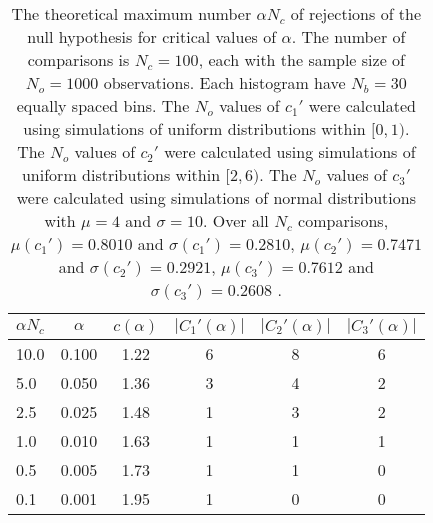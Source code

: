 \begin{table}[h!]
\begin{center}
\begin{tabular}{| l | c | c | c | c | c |}\hline
$\alpha N_c$ & $\alpha$ & $c(\alpha)$ & $|C_1'(\alpha)|$ & $|C_2'(\alpha)|$ & $|C_3'(\alpha)|$ \\\hline
10.0 & 0.100 & 1.22 & 6 & 8 & 6 \\\hline
5.0 & 0.050 & 1.36 & 3 & 4 & 2 \\\hline
2.5 & 0.025 & 1.48 & 1 & 3 & 2 \\\hline
1.0 & 0.010 & 1.63 & 1 & 1 & 1 \\\hline
0.5 & 0.005 & 1.73 & 1 & 1 & 0 \\\hline
0.1 & 0.001 & 1.95 & 1 & 0 & 0 \\\hline
\end{tabular}
\caption{The theoretical maximum number $\alpha N_c$ of rejections
of the null hypothesis for critical values of $\alpha$.
The number of comparisons is $N_c=100$,
each with the sample size of $N_o=1000$ observations.
Each histogram have $N_b=30$ equally spaced bins.
The $N_o$ values of $c_1'$ were calculated using simulations of
 uniform distributions within $[0,1)$.
The $N_o$ values of $c_2'$ were calculated using simulations of
 uniform distributions within $[2,6)$.
The $N_o$ values of $c_3'$ were calculated using simulations of
 normal distributions with $\mu=4$ and $\sigma=10$.
Over all $N_c$ comparisons,
 $\mu(c_1')=0.8010$ and $\sigma(c_1')=0.2810$,
 $\mu(c_2')=0.7471$ and $\sigma(c_2')=0.2921$,
 $\mu(c_3')=0.7612$ and $\sigma(c_3')=0.2608$ .
}
\end{center}
\end{table}